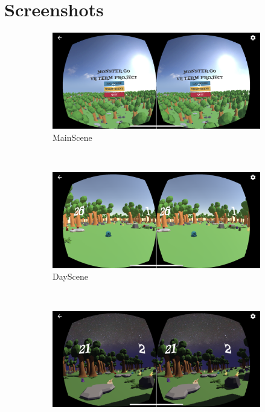 \documentclass{article}
\begin{document}
\section*{Screenshots}

\begin{figure}[!htb]
    \centering
    \begin{subfigure}[b]{0.49\textwidth}
        \includegraphics[width=\textwidth]{Screenshots/MainScene.png}
        \caption{MainScene}
    \end{subfigure}
    ~
    \begin{subfigure}[b]{0.49\textwidth}
        \includegraphics[width=\textwidth]{Screenshots/DayScene.png}
        \caption{DayScene}
    \end{subfigure}
    ~
    \begin{subfigure}[b]{0.49\textwidth}
        \includegraphics[width=\textwidth]{Screenshots/NightScene.png}

\end{subfigure}
\end{figure}
\end{document}
